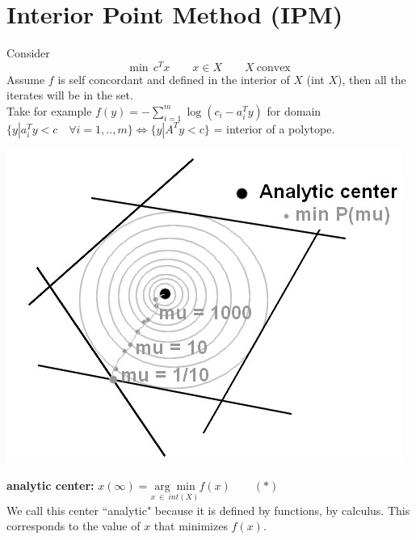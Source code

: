 \section{Interior Point Method (IPM)}
Consider 
$$ \text{min} ~~ c^T x \qquad x \in X \qquad X \ \text{convex}$$
Assume $f$ is self concordant and defined in the interior of $X$ (int $X$), then all the iterates will be in the set.\\
Take for example $f(y) = - \sum_{i = 1}^m \log(c_i - a_i^T y)$ for domain $\lbrace y | a_i^T y < c\quad \forall i = 1,..,m \rbrace \Longleftrightarrow \lbrace y | A^T y < c  \rbrace$ = interior of a polytope.\\
\begin{center}
\includegraphics[scale=0.5]{images/12-fig1.jpg} 
\end{center}

\begin{definition} 
\textbf{analytic center:} $x(\infty) = \underset{x\ \in \ int(X)}{\arg \min} f(x) \qquad (*)$  \\
We call this center ``analytic" because it is defined by functions, by calculus. This corresponds to the value of $x$ that minimizes $f(x)$.
\end{definition}

